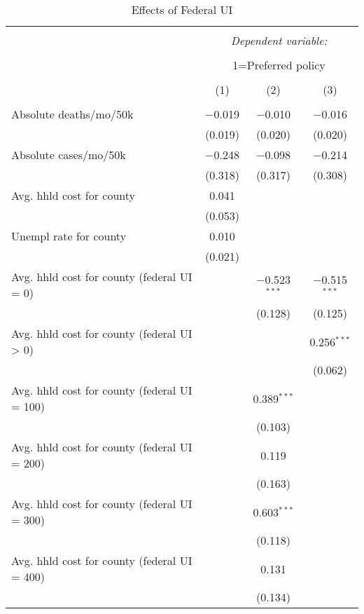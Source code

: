 
\begin{table}[!htbp] \centering 
 \scriptsize 
  \caption{Effects of Federal UI} 
  \label{} 
\begin{tabular}{@{\extracolsep{5pt}}lccc} 
\\[-1.8ex]\hline 
\hline \\[-1.8ex] 
 & \multicolumn{3}{c}{\textit{Dependent variable:}} \\ 
\cline{2-4} 
\\[-1.8ex] & \multicolumn{3}{c}{1=Preferred policy} \\ 
\\[-1.8ex] & (1) & (2) & (3)\\ 
\hline \\[-1.8ex] 
 Absolute deaths/mo/50k & $-$0.019 & $-$0.010 & $-$0.016 \\ 
  & (0.019) & (0.020) & (0.020) \\ 
  Absolute cases/mo/50k & $-$0.248 & $-$0.098 & $-$0.214 \\ 
  & (0.318) & (0.317) & (0.308) \\ 
  Avg. hhld cost for county & 0.041 &  &  \\ 
  & (0.053) &  &  \\ 
  Unempl rate for county & 0.010 &  &  \\ 
  & (0.021) &  &  \\ 
  Avg. hhld cost for county (federal UI = 0) &  & $-$0.523$^{***}$ & $-$0.515$^{***}$ \\ 
  &  & (0.128) & (0.125) \\ 
  Avg. hhld cost for county (federal UI > 0) &  &  & 0.256$^{***}$ \\ 
  &  &  & (0.062) \\ 
  Avg. hhld cost for county (federal UI = 100) &  & 0.389$^{***}$ &  \\ 
  &  & (0.103) &  \\ 
  Avg. hhld cost for county (federal UI = 200) &  & 0.119 &  \\ 
  &  & (0.163) &  \\ 
  Avg. hhld cost for county (federal UI = 300) &  & 0.603$^{***}$ &  \\ 
  &  & (0.118) &  \\ 
  Avg. hhld cost for county (federal UI = 400) &  & 0.131 &  \\ 
  &  & (0.134) &  \\ 

\end{tabular}
\end{table}
